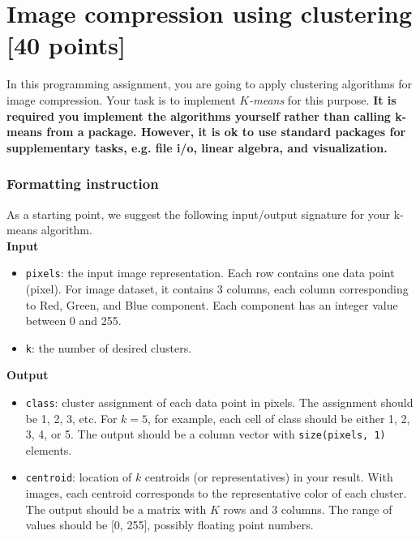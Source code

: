 \documentclass[twoside,10pt]{article}
\begin{document}
\section{Image compression using clustering [40 points]}

In this programming assignment, you are going to apply clustering algorithms for image compression. Your task is to implement \emph{$K$-means} for this purpose.  {\bf It is required you implement the algorithms yourself rather than calling k-means from a package. However, it is ok to use standard packages for supplementary tasks, e.g. file i/o, linear algebra, and visualization.} 


\subsubsection*{Formatting instruction}

As a starting point, we suggest the following input/output signature for your k-means algorithm.\\

\textbf{Input}
\begin{itemize}
  \item \texttt{pixels}: the input image representation. Each row contains one data point (pixel). For image dataset, it contains 3 columns, each column corresponding to Red, Green, and Blue component. Each component has an integer value between 0 and 255.
  \item \texttt{k}: the number of desired clusters.
\end{itemize}

\textbf{Output}
\begin{itemize}
  \item \texttt{class}: cluster assignment of each data point in pixels. The assignment should be 1, 2, 3, etc. For $k = 5$, for example, each cell of class should be either 1, 2, 3, 4, or 5. The output should be a column vector with \texttt{size(pixels, 1)} elements.
  \item \texttt{centroid}: location of $k$ centroids (or representatives) in your result. With images, each centroid corresponds to the representative color of each cluster. The output should be a matrix with $K$ rows and 3 columns. The range of values should be [0, 255], possibly floating point numbers.
\end{itemize}
\end{document}

